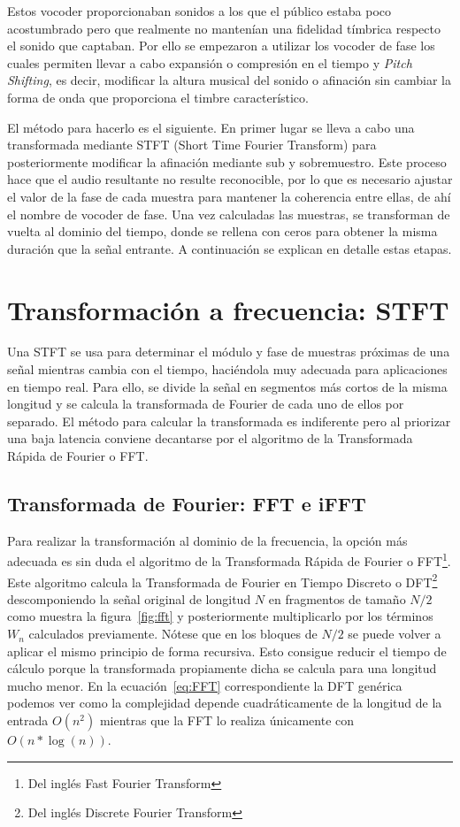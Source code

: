 Estos vocoder proporcionaban sonidos a los que el público estaba poco acostumbrado pero que realmente no mantenían una fidelidad tímbrica respecto el sonido que captaban. Por ello se empezaron a utilizar los vocoder de fase los cuales permiten llevar a cabo expansión o compresión en el tiempo y \emph{Pitch Shifting}, es decir, modificar la altura musical del sonido o afinación sin cambiar la forma de onda que proporciona el timbre característico.

El método para hacerlo es el siguiente. En primer lugar se lleva a cabo una transformada mediante STFT (Short Time Fourier Transform) para posteriormente modificar la afinación mediante sub y sobremuestro. Este proceso hace que el audio resultante no resulte reconocible, por lo que es necesario ajustar el valor de la fase de cada muestra para mantener la coherencia entre ellas, de ahí el nombre de vocoder de fase. Una vez calculadas las muestras, se transforman de vuelta al dominio del tiempo, donde se rellena con ceros para obtener la misma duración que la señal entrante. A continuación se explican en detalle estas etapas.

\section{Transformación a frecuencia: STFT}

Una STFT se usa para determinar el módulo y fase de muestras próximas de una señal mientras cambia con el tiempo, haciéndola muy adecuada para aplicaciones en tiempo real. Para ello, se divide la señal en segmentos más cortos de la misma longitud y se calcula la transformada de Fourier de cada uno de ellos por separado. El método para calcular la transformada es indiferente pero al priorizar una baja latencia conviene decantarse por el algoritmo de la Transformada Rápida de Fourier o FFT.

\subsection{Transformada de Fourier: FFT e iFFT}

Para realizar la transformación al dominio de la frecuencia, la opción más adecuada es sin duda el algoritmo de la Transformada Rápida de Fourier o FFT\footnote{Del inglés Fast Fourier Transform}. Este algoritmo calcula la Transformada de Fourier en Tiempo Discreto o DFT\footnote{Del inglés Discrete Fourier Transform} descomponiendo la señal original de longitud $N$ en fragmentos de tamaño $N/2$ como muestra la figura~\ref{fig:fft} y posteriormente multiplicarlo por los términos $W_{n}$ calculados previamente. Nótese que en los bloques de $N/2$ se puede volver a aplicar el mismo principio de forma recursiva. Esto consigue reducir el tiempo de cálculo porque la transformada propiamente dicha se calcula para una longitud mucho menor. En la ecuación~\ref{eq:FFT} correspondiente la DFT genérica podemos ver como la complejidad depende cuadráticamente de la longitud de la entrada $O({n^{2}})$ mientras que la FFT lo realiza únicamente con $O({n*\log (n)})$.

